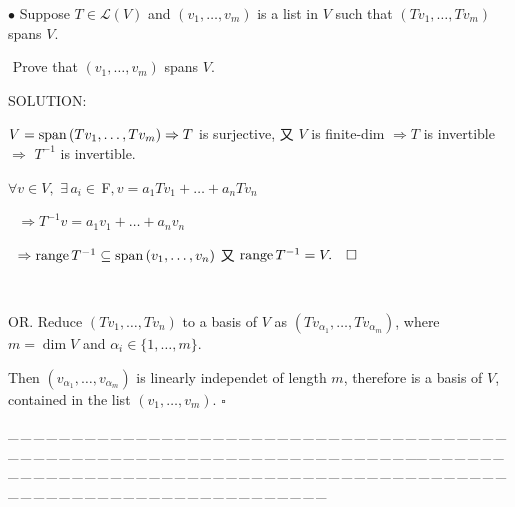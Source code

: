 \documentclass[a4paper, 11pt, UTF8]{article}
\def\range{\textup{range}\,}
\def\Spn{\textup{span}\,}
\def\Lm{\mathcal{L}}
\def\Fbfc{$\,{\timesbf F}$}
\begin{document}
\begin{large}
{\small $\bullet$} {\timessl\Large 
Suppose $T\in\Lm(V)$ and $(v_1,\dots,v_m)$ is a list in $V$ such that $(Tv_1,\dots,Tv_m)$ spans $V$.}\par\,\,{\timessl\Large Prove that $(v_1,\dots,v_m)$ spans $V$.
}\par
{\timesbf S\footnotesize{OLUTION:}}\par\quad
$V=\Spn(Tv_1,\dots,Tv_m)\Rightarrow T$ is surjective, 又 $V$ is finite-dim $\Rightarrow T$ is invertible $\Rightarrow$ $T^{-1}$ is invertible.\par\quad
$\forall v\in V,\,\,\exists\,a_i\in\Fbfc, v=a_1 Tv_1+\dots+a_n Tv_n$\par\qquad\qquad\quad\,\,
$\Rightarrow T^{-1}v=a_1 v_1+\dots+a_n v_n$\par\qquad\qquad\quad\,\,
$\Rightarrow \range T^{-1}\subseteq\Spn(v_1,\dots,v_n)$ 又 $\range T^{-1}=V.\quad\square$\par{\tiny{\,}\par}\quad
O{\small R.} Reduce $(Tv_1,\dots,Tv_n)$ to a basis of $V$ as $(Tv_{\alpha_1},\dots,Tv_{\alpha_m})$, where $m=\dim V$ and $\alpha_i\in\{1,\dots,m\}$.\par\quad
Then $(v_{\alpha_1},\dots,v_{\alpha_m})$ is linearly independet of length $m$, therefore is a basis of $V$, contained in the list $(v_1,\dots,v_m).\,\,\square$\par
{\tiny \_\,\_\,\_\,\_\,\_\,\_\,\_\,\_\,\_\,\_\,\_\,\_\,\_\,\_\,\_\,\_\,\_\,\_\,\_\,\_\,\_\,\_\,\_\,\_\,\_\,\_\,\_\,\_\,\_\,\_\,\_\,\_\,\_\,\_\,\_\,\_\,\_\,\_\,\_\,\_\,\_\,\_\,\_\,\_\,\_\,\_\,\_\,\_\,\_\,\_\,\_\,\_\,\_\,\_\,\_\,\_\,\_\,\_\,\_\,\_\,\_\,\_\,\_\,\_\,\_\,\_\,\_\,\_\,\_\,\_\,\_\_\,\_\,\_\,\_\,\_\,\_\,\_\,\_\,\_\,\_\,\_\,\_\,\_\,\_\,\_\,\_\,\_\,\_\,\_\,\_\,\_\,\_\,\_\,\_\,\_\,\_\,\_\,\_\,\_\,\_\,\_\,\_\,\_\,\_\,\_\,\_\,\_\,\_\,\_\,\_\,\_\,\_\,\_\,\_\,\_\,\_\,\_\,\_\,\_\,\_\,\_\,\_\,\_\,\_\,\_\,\_\,\_\,\_\,\_\,\_\,\_\,\_\,\_\,\_\,\_\,\_\,\_\,\_\,\_\,\_\,\_}\par



\end{large}
\end{document}
